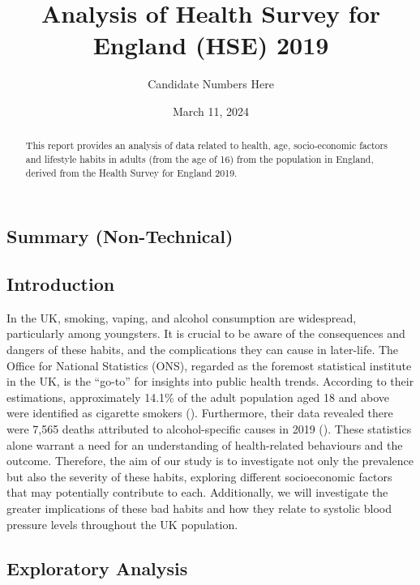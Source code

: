 \documentclass[
  11pt,
]{article}
\title{Analysis of Health Survey for England (HSE) 2019}
\author{Candidate Numbers Here}
\date{March 11, 2024}
\begin{document}
\maketitle
\begin{abstract}
This report provides an analysis of data related to health, age,
socio-economic factors and lifestyle habits in adults (from the age of
16) from the population in England, derived from the Health Survey for
England 2019.
\end{abstract}


\newpage

\subsection{Summary (Non-Technical)}\label{summary-non-technical}

\subsection{Introduction}\label{introduction}

In the UK, smoking, vaping, and alcohol consumption are widespread,
particularly among youngsters. It is crucial to be aware of the
consequences and dangers of these habits, and the complications they can
cause in later-life. The Office for National Statistics (ONS), regarded
as the foremost statistical institute in the UK, is the ``go-to'' for
insights into public health trends. According to their estimations,
approximately 14.1\% of the adult population aged 18 and above were
identified as cigarette smokers ().
Furthermore, their data revealed there were 7,565 deaths attributed to
alcohol-specific causes in 2019 (). These
statistics alone warrant a need for an understanding of health-related
behaviours and the outcome. Therefore, the aim of our study is to
investigate not only the prevalence but also the severity of these
habits, exploring different socioeconomic factors that may potentially
contribute to each. Additionally, we will investigate the greater
implications of these bad habits and how they relate to systolic blood
pressure levels throughout the UK population.

\subsection{Exploratory Analysis}\label{exploratory-analysis}
\end{document}
